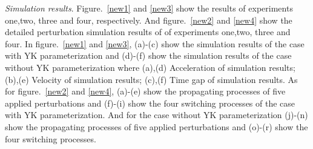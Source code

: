 \documentclass[a4paper,fleqn]{cas-sc}
\begin{document}



\textit{Simulation results}. Figure.~\ref{new1} and \ref{new3} show the results of experiments one,two, three and four, respectively. And figure.~\ref{new2} and \ref{new4} show the detailed perturbation simulation results of of experiments one,two, three and four. In figure.~\ref{new1} and \ref{new3}, (a)-(c) show the simulation results of the case with YK parameterization  and (d)-(f) show the simulation results of the case without YK parameterization where (a),(d) Acceleration of simulation results; (b),(e) Velocity of simulation results; (c),(f) Time gap of simulation results. As for figure.~\ref{new2} and \ref{new4}, (a)-(e) show the propagating processes of five applied perturbations and (f)-(i) show the four switching processes of the case with YK parameterization. And for the case without YK parameterization (j)-(n) show the propagating processes of five applied perturbations and (o)-(r) show the four switching processes.
\end{document}
